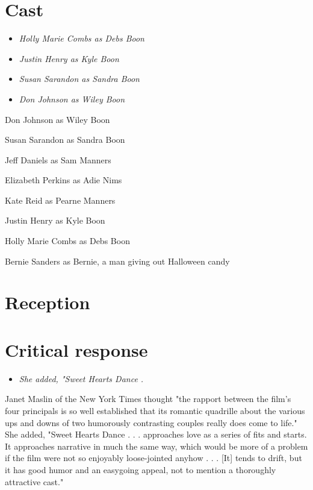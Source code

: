 \section{Cast}\label{cast}

\begin{itemize}
\item
  \emph{Holly Marie Combs as Debs Boon}
\item
  \emph{Justin Henry as Kyle Boon}
\item
  \emph{Susan Sarandon as Sandra Boon}
\item
  \emph{Don Johnson as Wiley Boon}
\end{itemize}

Don Johnson as Wiley Boon

Susan Sarandon as Sandra Boon

Jeff Daniels as Sam Manners

Elizabeth Perkins as Adie Nims

Kate Reid as Pearne Manners

Justin Henry as Kyle Boon

Holly Marie Combs as Debs Boon

Bernie Sanders as Bernie, a man giving out Halloween candy

\section{Reception}\label{reception}

\section{Critical response}\label{critical-response}

\begin{itemize}
\item
  \emph{She added, "Sweet Hearts Dance .}
\end{itemize}

Janet Maslin of the New York Times thought "the rapport between the
film's four principals is so well established that its romantic
quadrille about the various ups and downs of two humorously contrasting
couples really does come to life." She added, "Sweet Hearts Dance . . .
approaches love as a series of fits and starts. It approaches narrative
in much the same way, which would be more of a problem if the film were
not so enjoyably loose-jointed anyhow . . . {[}It{]} tends to drift, but
it has good humor and an easygoing appeal, not to mention a thoroughly
attractive cast."


